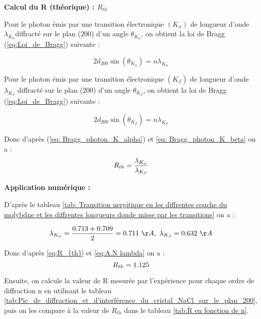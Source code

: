  \begin{flushleft}
	\textbf{Calcul du R (théorique) : $R_{th}$}
\end{flushleft}


Pour le photon émis par une transition électronique $(K_{\alpha})$ de longueur d'onde $\lambda_{K_{\alpha}}$diffracté sur le plan (200) d'un angle $\theta_{K_{\alpha}}$, on obtient la loi de Bragg (\ref{eq:Loi_de_Bragg}) suivante :

\begin{equation}\label{eq: Bragg_photon_K_alpha}
	2 d_{200}\sin(\theta_{K_{\alpha}}) = n\lambda_{K_{\alpha}}
\end{equation}

Pour le photon émis par une transition électronique $(K_{\beta})$ de longueur d'onde $\lambda_{K_{\beta}}$ diffracté sur le plan (200) d'un angle $\theta_{K_{\beta}}$, on obtient la loi de Bragg (\ref{eq:Loi_de_Bragg}) suivante :

\begin{equation}\label{eq: Bragg_photon_K_beta}
	2 d_{200}\sin(\theta_{K_{\beta}}) = n\lambda_{K_{\beta}}
\end{equation}

Donc d'après (\ref{eq: Bragg_photon_K_alpha}) et \ref{eq: Bragg_photon_K_beta} on a :
\begin{equation}\label{eq:R_{th}}
	R_{th} = \frac{\lambda_{K_{\alpha}}}{\lambda_{K_{\beta}}} 
\end{equation}


 \begin{flushleft}
	\textbf{Application numérique :}
\end{flushleft}


D'après le tableau \ref{tab: Transition nergitique en les diffrentes couche du molybdne et les diffrentes longueurs donde misse par les transitions} on a :

\begin{equation}\label{eq:A.N lambda}
	\lambda_{K_{\alpha}} = \frac{0.713 + 0.709}{2} = 0.711 \ \AA, \ \lambda_{K_{\beta}} =0.632 \ \AA
\end{equation}

Donc d'après \ref{eq:R_{th}} et \ref{eq:A.N lambda} on a :  
\begin{equation}\label{eq:R_{th}_A.N}
	R_{th} = 1.125
\end{equation}

\newpage
Ensuite, on calcule la valeur de R mesurée par l'expérience pour chaque ordre de diffraction n en utilisant le tableau \ref{tab:Pic_de_diffraction_et_d'interférence_du_cristal_NaCl_sur_le_plan_200}, puis on les compare à la valeur de $R_{th}$ dans le tableau \ref{tab:R en fonction de n}.





